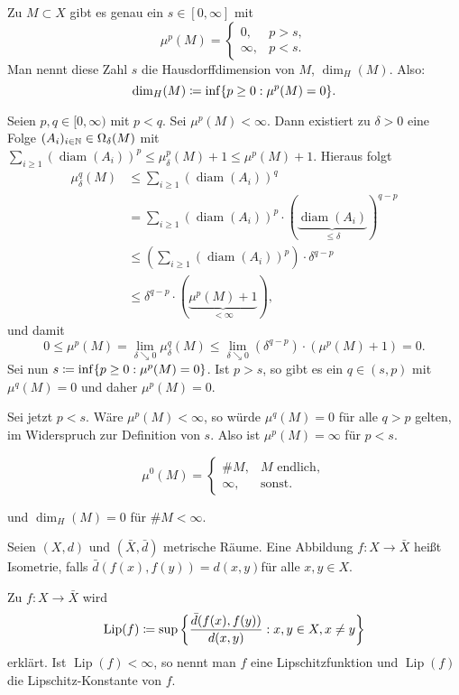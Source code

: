 \documentclass[a4paper,twoside,DIV15,BCOR12mm]{scrbook}
\DeclareMathOperator{\diam}{diam}
\DeclareMathOperator{\Lip}{Lip}
\begin{document}
\begin{proposition}
\label{prop:2.21}
Zu \(M \subset X\) gibt es genau ein \(s\in[0,\infty]\) mit
\[
\mu^p(M) = \begin{cases} 0, & p>s, \\ \infty, & p<s. \end{cases}
\]
Man nennt diese Zahl \(s\) die Hausdorffdimension von \(M\), \(\dim_H(M)\). Also:
\[
\dim_H(M) \da \inf\{p\geq0 : \mu^p(M)=0\}.
\]

\end{proposition}

\begin{beweis}
Seien \(p,q \in [0,\infty)\) mit \(p<q\). Sei \(\mu^p(M)<\infty\). Dann existiert zu \(\delta>0\) eine Folge \((A_i)_{i\in\mathbb{N}} \in \Omega_\delta(M)\) mit \(\sum_{i\geq1} {(\diam(A_i))}^p \leq \mu_\delta^p(M)+1 \leq \mu^p(M)+1\). Hieraus folgt
\begin{align*}
\mu_\delta^q(M) &
\leq \sum_{i\geq1} {(\diam(A_i))}^q \\ &
= \sum_{i\geq1} (\diam(A_i))^p \cdot (\underbrace{\diam(A_i)}_{\leq\delta})^{q-p} \\ &
\leq (\sum_{i\geq1} (\diam(A_i))^p)\cdot \delta^{q-p} \\ &
\leq \delta^{q-p}\cdot (\underbrace{\mu^p(M)+1}_{<\infty}),
\end{align*}
und damit
\[
0 \leq \mu^p(M) = \lim_{\delta\searrow0} \mu_\delta^q(M) \leq \lim_{\delta\searrow0}(\delta^{q-p})\cdot(\mu^p(M)+1) = 0.
\]
Sei nun \(s \da \inf\{p\geq0 : \mu^p(M) = 0\}\). Ist \(p>s\), so gibt es ein \(q\in(s,p)\) mit \(\mu^q(M) = 0\) und daher \(\mu^p(M)=0\).
\par
Sei jetzt \(p<s\). Wäre \(\mu^p(M)<\infty\), so würde \(\mu^q(M)=0\) für alle \(q>p\) gelten, im Widerspruch zur Definition von \(s\). Also ist \(\mu^p(M)=\infty\) für \(p<s\).
\end{beweis}

\begin{beispiel}
$$
\mu^0(M) = \begin{cases} \#M, & M \text{ endlich}, \\ \infty, & \text{sonst}. \end{cases}
$$
\par
und \(\dim_H(M) = 0\) für \(\#M < \infty\).
\end{beispiel}

\begin{definition}
Seien \((X,d)\) und \((\bar X,\bar d)\) metrische Räume. Eine Abbildung \(f: X \rightarrow \bar X\) heißt Isometrie, falls \(\bar d(f(x),f(y)) = d(x,y)\)für alle $ x,y\in X$. 
\par
Zu \(f:X \rightarrow \bar X\) wird
\[
\Lip(f) \da \sup\left\{\frac{\bar d(f(x),f(y))}{d(x,y)} : x,y \in X, x\neq y\right\}
\]
erklärt. Ist \(\Lip(f)<\infty\), so nennt man \(f\) eine Lipschitzfunktion und \(\Lip(f)\) die Lipschitz-Konstante von \(f\).
\end{definition}
\end{document}
